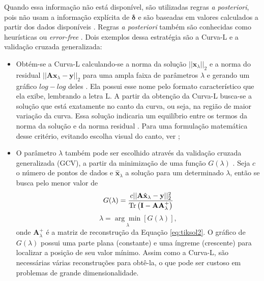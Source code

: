 Quando essa informação não está disponível, são utilizadas regras \textit{a posteriori}, pois não usam a informação explícita de $\bm{\delta}$ e são baseadas em valores calculados a partir dos dados disponíveis \cite[pág. 76]{kern2016numerical}. Regras \textit{a posteriori} também são conhecidas como heurísticas \cite[pág. 177]{hansen2010discrete} ou \textit{error-free} \cite[pág. 108]{engl1996regularization}. Dois exemplos dessa estratégia são a Curva-L e a validação cruzada generalizada:

\begin{itemize} 
\item Obtém-se a Curva-L calculando-se a norma da solução $\vert \vert \mathbf{x}_{\lambda} \vert \vert_2$ e a norma do residual $\vert \vert \mathbf{A} \mathbf{x}_{\lambda} - \mathbf{y} \vert \vert_2$ para uma ampla faixa de parâmetros $\lambda$ e gerando um gráfico $log-log$ deles \cite[págs. 73-5]{hansen2010discrete}. Ela possui esse nome pelo formato característico que ela exibe, lembrando a letra L. A partir da obtenção da Curva-L busca-se a solução que está exatamente no canto da curva, ou seja, na região de maior variação da curva. Essa solução indicaria um equilíbrio entre os termos da norma da solução e da norma residual \cite[pág. 71]{hansen2010discrete}. Para uma formulação matemática desse critério, evitando escolha visual do canto, ver \cite[pág. 110]{engl1996regularization};

\item O parâmetro $\lambda$ também pode ser escolhido através da validação cruzada generalizada (GCV), a partir da minimização de uma função $G(\lambda)$ \cite[págs. 116-7]{aster2019parameter} \cite[págs. 95-6]{hansen2010discrete}. Seja $c$ o número de pontos de dados e $\hat{\mathbf{x}}_{\lambda}$ a solução para um determinado $\lambda$, então se busca pelo menor valor de 
\begin{equation}
G(\lambda) = \frac{c \vert \vert \mathbf{A} \hat{\mathbf{x}}_{\lambda} - \mathbf{y} \vert \vert_2^2 }{\operatorname{Tr}\left (\mathbf{I} - \mathbf{A} \mathbf{A}^+_{\lambda}\right)}
\end{equation} 
\begin{equation}
\lambda = \underset{\lambda}{\arg\min} [G(\lambda)], 
\end{equation} 
onde $\mathbf{A}^+_{\lambda}$ é a matriz de reconstrução da Equação \eqref{eq:tiksol2}. O gráfico de $G(\lambda)$ possui uma parte plana (constante) e uma íngreme (crescente) para localizar a posição de seu valor mínimo. Assim como a Curva-L, são necessárias várias reconstruções para obtê-la, o que pode ser custoso em problemas de grande dimensionalidade. 
\end{itemize} 


